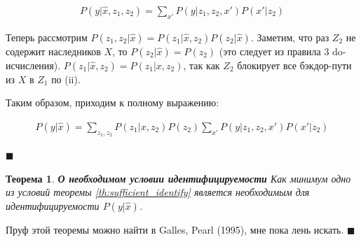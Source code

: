 \documentclass[fleqn]{article}
\newtheorem{theorem}{Теорема}
\numberwithin{equation}{section}
\begin{document}
\begin{align}
	P(y|\hat x, z_1, z_2) = \sum\limits_{x'} P(y|z_1, z_2, x')P(x'|z_2)
\end{align}

Теперь рассмотрим $P(z_1, z_2 | \hat x) = P(z_1 | \hat x, z_2) P(z_2 | \hat x)$. Заметим, что раз $Z_2$ не содержит наследников $X$, то $P(z_2|\hat x) = P(z_2)$ (это следует из правила 3 do-исчисления). $P(z_1 | \hat x, z_2) = P(z_1 |  x, z_2)$, так как  $Z_2$ блокирует все бэкдор-пути из $X$ в $Z_1$ по (ii). 

Таким образом, приходим к полному выражению:

\begin{align}
	P(y|\hat x) = \sum\limits_{z_1,z_2}P(z_1|x, z_2)P(z_2)\sum\limits_{x'} P(y|z_1, z_2, x')P(x'|z_2)
\end{align}

$\blacksquare$

\begin{theorem}
	\textbf{О необходимом условии идентифицируемости} Как минимум одно из условий теоремы \ref{th:sufficient_identify} является необходимым для идентифицируемости $P(y|\hat x)$. 
\end{theorem}

Пруф этой теоремы можно найти в Galles, Pearl (1995), мне пока лень искать.
$\blacksquare$
\end{document}
